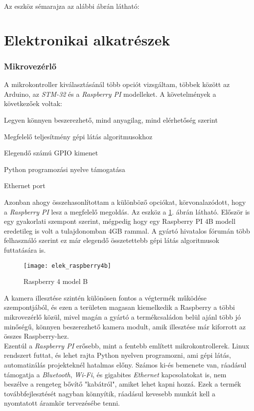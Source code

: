 Az eszköz sémarajza az alábbi ábrán látható:


\pagebreak

\section{Elektronikai alkatrészek}
\subsubsection*{Mikrovezérlő}
A mikrokontroller kiválasztásánál több opciót vizsgáltam, többek között az {Arduino}, az \textsl{STM-32} és a \textsl{Raspberry PI} modelleket. A követelmények a következőek voltak:

\begin{list}{-}{}
	\item Legyen könnyen beszerezhető, mind anyagilag, mind elérhetőség szerint
	\item Megfelelő teljesítmény gépi látás algoritmusokhoz
	\item Elegendő számú GPIO kimenet
	\item Python programozási nyelve támogatása
	\item Ethernet port
\end{list}

Azonban ahogy összehasonlítottam a különböző opciókat, körvonalazódott, hogy a \textsl{Raspberry PI} lesz a megfelelő megoldás. Az eszköz a \ref{fig:elek_raspberry4b}. ábrán látható. Először is egy gyakorlati szempont szerint, mégpedig hogy egy Raspberry PI 4B modell eredetileg is volt a tulajdonomban 4GB rammal. A gyártó hivatalos fórumán több felhasználó szerint ez már elegendő összetettebb gépi látás algoritmusok futtatására is. \cite{4gbforum} \\

\begin{figure}[h!]
	\centering
	\texttt{[image: elek\_raspberry4b]}
	\caption{Raspberry 4 model B \cite{raspberry4}}
	\label{fig:elek_raspberry4b}
\end{figure}

A kamera illesztése szintén különösen fontos a végtermék működése szempontjából, és ezen a területen magasan kiemelkedik a Raspberry a többi mikrovezérlő közül, mivel magán a gyártó a termékcsaládon belül ajánl több jó minőségű, könnyen beszerezhető kamera modult, amik illesztése már kiforrott az összes Raspberry-hez.\\

Ezentúl a \textsl{Raspberry PI} erősebb, mint a fentebb említett mikrokontrollerek. Linux rendszert futtat, és lehet rajta Python nyelven programozni, ami gépi látás, automatizálás projekteknél hatalmas előny. Számos ki-és bemenete van, ráadásul támogatja a \textsl{Bluetooth}, \textsl{Wi-Fi}, és gigabites \textsl{Ethernet} kapcsolatokat is, nem beszélve a rengeteg bővítő "kabátról", amiket lehet kapni hozzá. Ezek a termék továbbfejlesztését nagyban könnyítik, ráadásul kevesebb munkát kell a nyomtatott áramkör tervezésébe tenni. \cite{raspberry4}


